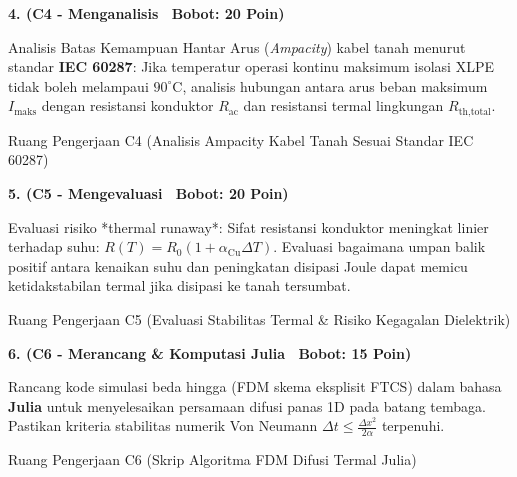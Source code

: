 \documentclass[10pt,a4paper]{article}
\begin{document}
\newpage

\noindent\textbf{4. (C4 - Menganalisis \textbar\ Bobot: 20 Poin)}\par\vspace{0.5mm}
{\footnotesize Analisis Batas Kemampuan Hantar Arus (\textit{Ampacity}) kabel tanah menurut standar \textbf{IEC 60287}: Jika temperatur operasi kontinu maksimum isolasi XLPE tidak boleh melampaui $90^\circ\text{C}$, analisis hubungan antara arus beban maksimum $I_{\text{maks}}$ dengan resistansi konduktor $R_{\text{ac}}$ dan resistansi termal lingkungan $R_{\text{th,total}}$.}
\begin{answerbox}{Ruang Pengerjaan C4 (Analisis Ampacity Kabel Tanah Sesuai Standar IEC 60287)}
  \vspace{3.8cm}
\end{answerbox}

\vspace{1.5mm}

\noindent\textbf{5. (C5 - Mengevaluasi \textbar\ Bobot: 20 Poin)}\par\vspace{0.5mm}
{\footnotesize Evaluasi risiko *thermal runaway*: Sifat resistansi konduktor meningkat linier terhadap suhu: $R(T) = R_0(1 + \alpha_{\text{Cu}} \Delta T)$. Evaluasi bagaimana umpan balik positif antara kenaikan suhu dan peningkatan disipasi Joule dapat memicu ketidakstabilan termal jika disipasi ke tanah tersumbat.}
\begin{answerbox}{Ruang Pengerjaan C5 (Evaluasi Stabilitas Termal \& Risiko Kegagalan Dielektrik)}
  \vspace{3.8cm}
\end{answerbox}

\vspace{1.5mm}

\noindent\textbf{6. (C6 - Merancang \& Komputasi Julia \textbar\ Bobot: 15 Poin)}\par\vspace{0.5mm}
{\footnotesize Rancang kode simulasi beda hingga (FDM skema eksplisit FTCS) dalam bahasa \textbf{Julia} untuk menyelesaikan persamaan difusi panas 1D pada batang tembaga. Pastikan kriteria stabilitas numerik Von Neumann $\Delta t \le \frac{\Delta x^2}{2\alpha}$ terpenuhi.}
\begin{answerbox}{Ruang Pengerjaan C6 (Skrip Algoritma FDM Difusi Termal Julia)}
  \vspace{3.8cm}
\end{answerbox}
\end{document}
